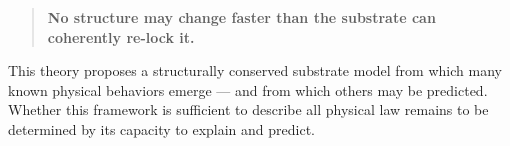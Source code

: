 \documentclass[entropy,article,submit,pdftex,moreauthors]{Definitions/mdpi}
\begin{document}
\begin{quote}
\textbf{No structure may change faster than the substrate can coherently re-lock it.}
\end{quote}

This theory proposes a structurally conserved substrate model from which many known physical behaviors emerge — and from which others may be predicted.
Whether this framework is sufficient to describe all physical law remains to be determined by its capacity to explain and predict.
\vspace{6pt} 




\end{document}
